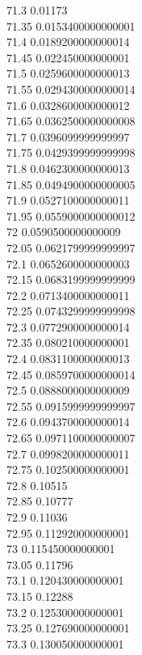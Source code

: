 {71.3	0.01173\\
71.35	0.0153400000000001\\
71.4	0.0189200000000014\\
71.45	0.022450000000001\\
71.5	0.0259600000000013\\
71.55	0.0294300000000014\\
71.6	0.0328600000000012\\
71.65	0.0362500000000008\\
71.7	0.0396099999999997\\
71.75	0.0429399999999998\\
71.8	0.0462300000000013\\
71.85	0.0494900000000005\\
71.9	0.0527100000000011\\
71.95	0.0559000000000012\\
72	0.0590500000000009\\
72.05	0.0621799999999997\\
72.1	0.0652600000000003\\
72.15	0.0683199999999999\\
72.2	0.0713400000000011\\
72.25	0.0743299999999998\\
72.3	0.0772900000000014\\
72.35	0.080210000000001\\
72.4	0.0831100000000013\\
72.45	0.0859700000000014\\
72.5	0.0888000000000009\\
72.55	0.0915999999999997\\
72.6	0.0943700000000014\\
72.65	0.0971100000000007\\
72.7	0.0998200000000011\\
72.75	0.102500000000001\\
72.8	0.10515\\
72.85	0.10777\\
72.9	0.11036\\
72.95	0.112920000000001\\
73	0.115450000000001\\
73.05	0.11796\\
73.1	0.120430000000001\\
73.15	0.12288\\
73.2	0.125300000000001\\
73.25	0.127690000000001\\
73.3	0.130050000000001\\
}
